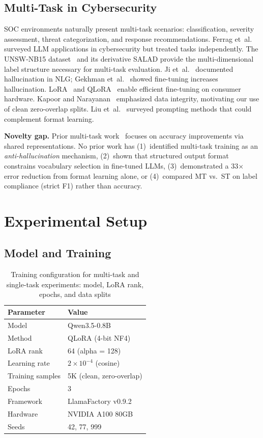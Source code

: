 \documentclass[review,3p]{elsarticle}
\begin{document}
\subsection{Multi-Task in Cybersecurity}
SOC environments naturally present multi-task scenarios: classification, severity assessment, threat categorization, and response recommendations. Ferrag et~al.~\cite{ferrag2024} surveyed LLM applications in cybersecurity but treated tasks independently. The UNSW-NB15 dataset~\cite{moustafa2016} and its derivative SALAD provide the multi-dimensional label structure necessary for multi-task evaluation. Ji et~al.~\cite{ji2023} documented hallucination in NLG; Gekhman et~al.~\cite{gekhman2024} showed fine-tuning increases hallucination. LoRA~\cite{hu2022} and QLoRA~\cite{dettmers2023} enable efficient fine-tuning on consumer hardware. Kapoor and Narayanan~\cite{kapoor2023} emphasized data integrity, motivating our use of clean zero-overlap splits. Liu et~al.~\cite{liu2023} surveyed prompting methods that could complement format learning.

\textbf{Novelty gap.} Prior multi-task work~\cite{caruana1997,raffel2020} focuses on accuracy improvements via shared representations. No prior work has (1)~identified multi-task training as an \emph{anti-hallucination} mechanism, (2)~shown that structured output format constrains vocabulary selection in fine-tuned LLMs, (3)~demonstrated a 33$\times$ error reduction from format learning alone, or (4)~compared MT vs.\ ST on label compliance (strict F1) rather than accuracy.

\section{Experimental Setup}

\subsection{Model and Training}
\begin{table}[!ht]
\centering
\caption{Training configuration for multi-task and single-task experiments: model, LoRA rank, epochs, and data splits}
\label{tab:config}
\begin{tabular}{ll}
\toprule
\textbf{Parameter} & \textbf{Value} \\
\midrule
Model & Qwen3.5-0.8B \\
Method & QLoRA (4-bit NF4) \\
LoRA rank & 64 (alpha = 128) \\
Learning rate & $2 \times 10^{-4}$ (cosine) \\
Training samples & 5K (clean, zero-overlap) \\
Epochs & 3 \\
Framework & LlamaFactory v0.9.2 \\
Hardware & NVIDIA A100 80GB \\
Seeds & 42, 77, 999 \\
\bottomrule
\end{tabular}
\end{table}
\end{document}
